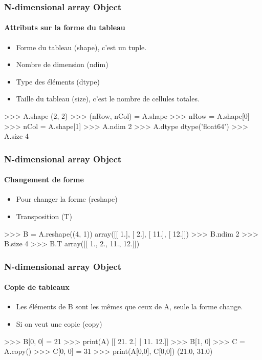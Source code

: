 \begin{frame}[fragile]
\frametitle{N-dimensional array Object}
\framesubtitle{Attributs sur la forme du tableau}
\begin{itemize}
 \item Forme du tableau (shape), c'est un tuple.  
 \item Nombre de dimension (ndim)
 \item Type des éléments (dtype)
 \item Taille du tableau (size), c'est le nombre de cellules totales. 
\end{itemize}
\begin{pythonConsole}
>>> A.shape
(2, 2)
>>> (nRow, nCol) = A.shape
>>> nRow = A.shape[0]
>>> nCol = A.shape[1]
>>> A.ndim
2
>>> A.dtype
dtype('float64')
>>> A.size
4
\end{pythonConsole}
\end{frame}
\begin{frame}[fragile]
\frametitle{N-dimensional array Object}
\framesubtitle{Changement de forme}
\begin{itemize}
 \item Pour changer la forme (reshape)
 \item Transposition (T)
\end{itemize}
\begin{pythonConsole}
>>> B = A.reshape((4, 1))
array([[  1.],
       [  2.],
       [ 11.],
       [ 12.]])
>>> B.ndim
2
>>> B.size
4
>>> B.T
array([[ 1.,   2.,  11.,  12.]])
\end{pythonConsole}
\end{frame}
\begin{frame}[fragile]
\frametitle{N-dimensional array Object}
\framesubtitle{Copie de tableaux}
\begin{itemize}
 \item Les éléments de B sont les mêmes que ceux de A, seule la forme change. 
 \item Si on veut une copie (copy)
\end{itemize}
\begin{pythonConsole}
>>> B[0, 0] = 21
>>> print(A)
[[ 21.   2.]
 [ 11.  12.]]
>>> B[1, 0]
>>> C = A.copy()
>>> C[0, 0] = 31
>>> print(A[0,0], C[0,0])
(21.0, 31.0)
\end{pythonConsole}
\end{frame}
